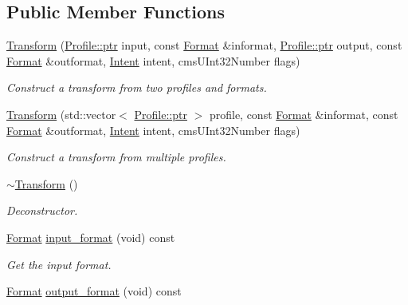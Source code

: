 \subsection*{Public Member Functions}
\begin{DoxyCompactItemize}
\item 
\hyperlink{class_c_m_s_1_1_transform_a55f27c5ecf8005a39792686930395827}{Transform} (\hyperlink{class_c_m_s_1_1_profile_a7d5a80e1317d17dbfdf5ae69820ab08b}{Profile\+::ptr} input, const \hyperlink{class_c_m_s_1_1_format}{Format} \&informat, \hyperlink{class_c_m_s_1_1_profile_a7d5a80e1317d17dbfdf5ae69820ab08b}{Profile\+::ptr} output, const \hyperlink{class_c_m_s_1_1_format}{Format} \&outformat, \hyperlink{namespace_c_m_s_aabe6afbe3c2cd6188befc3096f1ea069}{Intent} intent, cms\+U\+Int32\+Number flags)
\begin{DoxyCompactList}\small\item\em Construct a transform from two profiles and formats. \end{DoxyCompactList}\item 
\hyperlink{class_c_m_s_1_1_transform_a57aedf6fd469c51b245a28afb36f8eaf}{Transform} (std\+::vector$<$ \hyperlink{class_c_m_s_1_1_profile_a7d5a80e1317d17dbfdf5ae69820ab08b}{Profile\+::ptr} $>$ profile, const \hyperlink{class_c_m_s_1_1_format}{Format} \&informat, const \hyperlink{class_c_m_s_1_1_format}{Format} \&outformat, \hyperlink{namespace_c_m_s_aabe6afbe3c2cd6188befc3096f1ea069}{Intent} intent, cms\+U\+Int32\+Number flags)
\begin{DoxyCompactList}\small\item\em Construct a transform from multiple profiles. \end{DoxyCompactList}\item 
\hyperlink{class_c_m_s_1_1_transform_ac76565923f8999c82fa8f1f65ad2e43d}{$\sim$\+Transform} ()
\begin{DoxyCompactList}\small\item\em Deconstructor. \end{DoxyCompactList}\item 
\hyperlink{class_c_m_s_1_1_format}{Format} \hyperlink{class_c_m_s_1_1_transform_a2ae2120950c35eccd3dd9006d39b0049}{input\+\_\+format} (void) const
\begin{DoxyCompactList}\small\item\em Get the input format. \end{DoxyCompactList}\item 
\hyperlink{class_c_m_s_1_1_format}{Format} \hyperlink{class_c_m_s_1_1_transform_af907adbba92096714d54d99e9a99c53d}{output\+\_\+format} (void) const

\end{DoxyCompactItemize}
